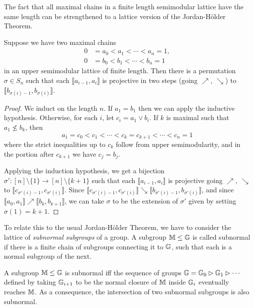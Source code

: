 \begin{appendices}
The fact that all maximal chains in a finite length semimodular lattice have the same length can be strengthened to a lattice version of the Jordan-H\"older Theorem.

\begin{thm} Suppose we have two maximal chains
\begin{align*}
0 &= a_0 < a_1 < \cdots < a_n = 1,\\
0 &= b_0 < b_1 < \cdots < b_n = 1
\end{align*}
in an upper semimodular lattice of finite length. Then there is a permutation $\sigma \in S_n$ such that each $\llbracket a_{i-1}, a_i\rrbracket$ is projective in two steps (going $\nearrow$, $\searrow$) to $\llbracket b_{\sigma(i)-1}, b_{\sigma(i)} \rrbracket$.
\end{thm}
\begin{proof} We induct on the length $n$. If $a_1 = b_1$ then we can apply the inductive hypothesis. Otherwise, for each $i$, let $c_i = a_1 \vee b_i$. If $k$ is maximal such that $a_1 \not\le b_k$, then
\[
a_1 = c_0 < c_1 < \cdots < c_k = c_{k+1} < \cdots < c_n = 1
\]
where the strict inequalities up to $c_k$ follow from upper semimodularity, and in the portion after $c_{k+1}$ we have $c_j = b_j$.

Applying the induction hypothesis, we get a bijection $\sigma' : [n]\setminus\{1\} \rightarrow [n]\setminus\{k+1\}$ such that each $\llbracket a_{i-1}, a_i\rrbracket$ is projective going $\nearrow$, $\searrow$ to $\llbracket c_{\sigma'(i)-1}, c_{\sigma'(i)} \rrbracket$. Since $\llbracket c_{\sigma'(i)-1}, c_{\sigma'(i)} \rrbracket \searrow \llbracket b_{\sigma'(i)-1}, b_{\sigma'(i)} \rrbracket$, and since $\llbracket a_0, a_1 \rrbracket \nearrow \llbracket b_k, b_{k+1}\rrbracket$, we can take $\sigma$ to be the extension of $\sigma'$ given by setting $\sigma(1) = k+1$.
\end{proof}

To relate this to the usual Jordan-H\"older Theorem, we have to consider the lattice of \emph{subnormal subgroups} of a group. A subgroup $\mathbb{M} \le \mathbb{G}$ is called subnormal if there is a finite chain of subgroups connecting it to $\mathbb{G}$, such that each is a normal subgroup of the next.

\begin{prop} A subgroup $\mathbb{M} \le \mathbb{G}$ is subnormal iff the sequence of groups $\mathbb{G} = \mathbb{G}_0 \rhd \mathbb{G}_1 \rhd \cdots$ defined by taking $\mathbb{G}_{i+1}$ to be the normal closure of $\mathbb{M}$ inside $\mathbb{G}_i$ eventually reaches $\mathbb{M}$. As a consequence, the intersection of two subnormal subgroups is also subnormal.
\end{prop}


\end{appendices}
